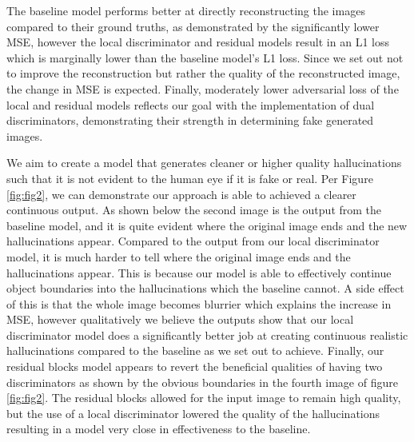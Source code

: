 \documentclass{article}
\begin{document}
The baseline model performs better at directly reconstructing the images compared to their ground truths, as demonstrated by the significantly lower MSE, however the local discriminator and residual models result in an L1 loss which is marginally lower than the baseline model's L1 loss. Since we set out not to improve the reconstruction but rather the quality of the reconstructed image, the change in MSE is expected. Finally,  moderately lower adversarial loss of the local and residual models reflects our goal with the implementation of dual discriminators, demonstrating their strength in determining fake generated images.

We aim to create a model that generates cleaner or higher quality hallucinations such that it is not evident to the human eye if it is fake or real. Per Figure \ref{fig:fig2}, we can demonstrate our approach is able to achieved a clearer continuous output. As shown below the second image is the output from the baseline model, and it is quite evident where the original image ends and the new hallucinations appear. Compared to the output from our local discriminator model, it is much harder to tell where the original image ends and the hallucinations appear. This is because our model is able to effectively continue object boundaries into the hallucinations which the baseline cannot. A side effect of this is that the whole image becomes blurrier which explains the increase in MSE, however qualitatively we believe the outputs show that our local discriminator model does a significantly better job at creating continuous realistic hallucinations compared to the baseline as we set out to achieve. Finally, our residual blocks model appears to revert the beneficial qualities of having two discriminators as shown by the obvious boundaries in the fourth image of figure \ref{fig:fig2}. The residual blocks allowed for the input image to remain high quality, but the use of a local discriminator lowered the quality of the hallucinations resulting in a model very close in effectiveness to the baseline.
\end{document}
